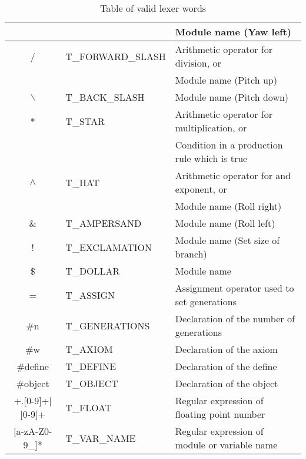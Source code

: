 \begin{table}[h!]
\begin{tabular}{ | c | l | l |}
					&						& Module name (Yaw left)\\
\hline
	/ 				& T\_FORWARD\_SLASH 	& Arithmetic operator for division, or\\
					&						& Module name (Pitch up)\\
\hline
	$\backslash$ 		& T\_BACK\_SLASH 		& Module name (Pitch down)\\
\hline
	* 				& T\_STAR 				& Arithmetic operator for multiplication, or\\
					&						& Condition in a production rule which is true\\
\hline
	$\land$		& T\_HAT 				& Arithmetic operator for and exponent, or\\
					&						& Module name (Roll right)\\
\hline
	$\&$ 			& T\_AMPERSAND 			& Module name (Roll left)\\
\hline
	! 				& T\_EXCLAMATION 		& Module name (Set size of branch)\\
\hline
	\$ 				& T\_DOLLAR 			& Module name \\
\hline
	= 				& T\_ASSIGN 			& Assignment operator used to set generations\\
\hline
	\#n 			& T\_GENERATIONS 		& Declaration of the number of generations\\
\hline
	\#w 			& T\_AXIOM 				& Declaration of the axiom\\
\hline
	\#define 			& T\_DEFINE 		& Declaration of the define\\
\hline
	\#object 			& T\_OBJECT			& Declaration of the object\\
\hline
	[0-9]+.[0-9]+$|$[0-9]+ 					& T\_FLOAT 				& Regular expression of floating point number\\
\hline
	[a-zA-Z\_][a-zA-Z0-9\_]*  				& T\_VAR\_NAME 			& Regular expression of module or variable name\\
\hline
\end{tabular}
\caption{Table of valid lexer words}
\label{lexer words}
\end{table}
\FloatBarrier

